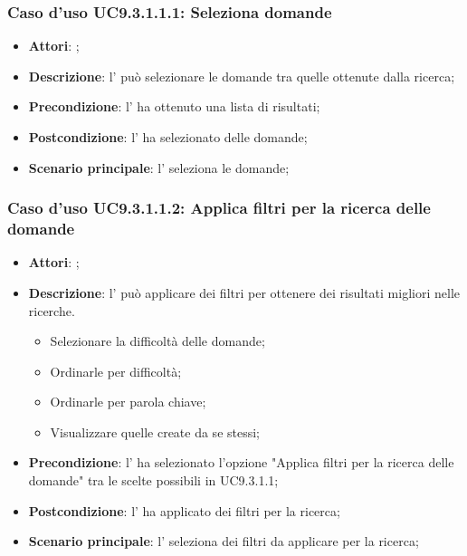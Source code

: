 		 \subsubsection{Caso d'uso UC9.3.1.1.1: Seleziona domande}
		 \label{UC9.3.1.1.1}
		 \begin{itemize}
		 	\item \textbf{Attori}: \uaupro{};
		 	\item \textbf{Descrizione}: l'\uaupro{} può selezionare le domande tra quelle ottenute dalla ricerca;
		 	\item \textbf{Precondizione}: l'\uaupro{} ha ottenuto una lista di risultati;
		 	\item \textbf{Postcondizione}: l'\uaupro{} ha selezionato delle domande; 
		 	\item \textbf{Scenario principale}: l'\uaupro{} seleziona le domande;
		 \end{itemize}
		 
		 \subsubsection{Caso d'uso UC9.3.1.1.2: Applica filtri per la ricerca delle domande}
		 \label{UC9.3.1.1.2}
		 \begin{itemize}
		 	\item \textbf{Attori}: \uaupro{};
		 	\item \textbf{Descrizione}: l'\uaupro{} può applicare dei filtri per ottenere dei risultati migliori nelle ricerche. 
			 	\begin{itemize}
					\item Selezionare la difficoltà delle domande;
					\item Ordinarle per difficoltà;
					\item Ordinarle per parola chiave;
					\item Visualizzare quelle create da se stessi;
			 	\end{itemize}
		 	\item \textbf{Precondizione}: l'\uaupro{} ha selezionato l'opzione "Applica filtri per la ricerca delle domande" tra le scelte possibili in UC9.3.1.1;
		 	\item \textbf{Postcondizione}: l'\uaupro{} ha applicato dei filtri per la ricerca; 
		 	\item \textbf{Scenario principale}: l'\uaupro{} seleziona dei filtri da applicare per la ricerca;
		 \end{itemize}
		 

